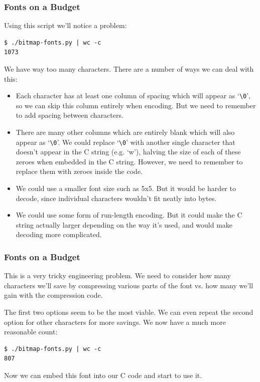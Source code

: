 \documentclass[handout,xcolor]{beamer}
\begin{document}
\begin{frame}[fragile]
	\frametitle{Fonts on a Budget}
	\pause
	
	Using this script we'll notice a problem:
	
	\begin{lstlisting}
$ ./bitmap-fonts.py | wc -c
1073\end{lstlisting}
	
	We have way too many characters. There are a number of ways we can deal with this:
	
	\begin{itemize}
		\footnotesize
		\item Each character has at least one column of spacing which will appear as `\texttt{\textbackslash0}', so we can skip this column entirely when encoding. \pause But we need to remember to add spacing between characters.
		\pause
		
		\item There are many other columns which are entirely blank which will also appear as `\texttt{\textbackslash0}'. We could replace `\texttt{\textbackslash0}' with another single character that doesn't appear in the C string (e.g. `w'), halving the size of each of these zeroes when embedded in the C string. \pause However, we need to remember to replace them with zeroes inside the code.
		\pause
		
		\item We could use a smaller font size such as 5x5. \pause But it would be harder to decode, since individual characters wouldn't fit neatly into bytes.
		\pause
		
		\item We could use some form of run-length encoding. \pause But it could make the C string actually larger depending on the way it's used, and would make decoding more complicated.
	\end{itemize}
\end{frame}

\begin{frame}[fragile]
	\frametitle{Fonts on a Budget}
	\pause
	
	This is a very tricky engineering problem. We need to consider how many characters we'll save by compressing various parts of the font vs. how many we'll gain with the compression code.
	\pause
	
	The first two options seem to be the most viable. We can even repeat the second option for other characters for more savings. We now have a much more reasonable count:
	\pause
	
	\begin{lstlisting}
$ ./bitmap-fonts.py | wc -c
807\end{lstlisting}
	\pause

	Now we can embed this font into our C code and start to use it.
\end{frame}
\end{document}
